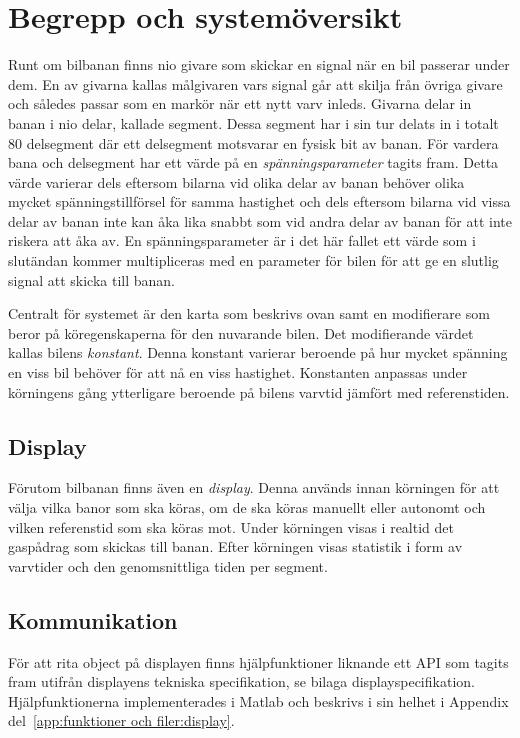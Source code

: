 \section{Begrepp och systemöversikt}
\label{sec:begrepp och systemöversikt}

Runt om bilbanan finns nio givare som skickar en signal när en bil passerar under
dem. En av givarna kallas målgivaren vars signal går att skilja från övriga
givare och således passar som en markör när ett nytt varv inleds. Givarna
delar in banan i nio delar, kallade segment. Dessa segment har i sin tur delats
in i totalt 80 delsegment där ett delsegment motsvarar en fysisk bit av banan.
För vardera bana och delsegment har ett värde på en \emph{spänningsparameter}
tagits fram. Detta värde varierar dels eftersom bilarna vid olika delar av banan
behöver olika mycket spänningstillförsel för samma hastighet och dels eftersom
bilarna vid vissa delar av banan inte kan åka lika snabbt som vid andra delar av
banan för att inte riskera att åka av. En spänningsparameter är i det här fallet
ett värde som i slutändan kommer multipliceras med en parameter för bilen för
att ge en slutlig signal att skicka till banan.

Centralt för systemet är den karta som beskrivs ovan samt en
modifierare som beror på köregenskaperna för den nuvarande bilen. Det
modifierande värdet kallas bilens \emph{konstant}. Denna konstant varierar
beroende på hur mycket spänning en viss bil behöver för att nå en viss
hastighet. Konstanten anpassas under körningens gång ytterligare beroende på
bilens varvtid jämfört med referenstiden.

\subsection{Display}

Förutom bilbanan finns även en \emph{display}. Denna används innan körningen för att välja vilka banor som ska köras, om de ska köras manuellt eller autonomt och vilken referenstid som ska köras mot. Under körningen visas i realtid det gaspådrag som skickas till banan. Efter körningen visas statistik i form av varvtider och den genomsnittliga tiden per segment.

\subsection{Kommunikation}

För att rita object på displayen finns hjälpfunktioner liknande ett API som
tagits fram utifrån displayens tekniska specifikation, se bilaga displayspecifikation.
Hjälpfunktionerna implementerades i Matlab och beskrivs i sin helhet i Appendix
del~\ref{app:funktioner och filer:display}.

